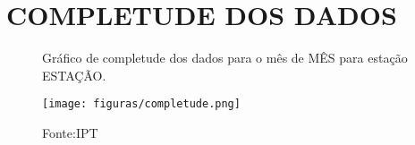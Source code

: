 \section{COMPLETUDE DOS DADOS}

\label{fig:completude}
\begin{figure}[htb!]
    \centering
	\captionsetup{justification=raggedright, singlelinecheck=false, width=1\textwidth}
    \caption{Gráfico de completude dos dados para o mês de MÊS para estação ESTAÇÃO.}
    \texttt{[image: figuras/completude.png]} %
    \caption*{Fonte:IPT}
	\label{fig:completude}
\end{figure}

